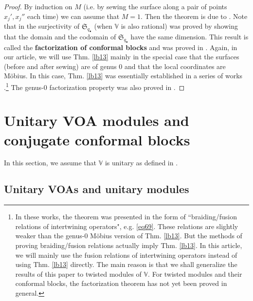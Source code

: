 \documentclass[11pt,b5paper,notitlepage]{article}
\theoremstyle{definition}
\theoremstyle{plain}
\newcommand{\fk}{\mathfrak}
\newcommand{\blt}{\bullet}
\newcommand{\Vbb}{\mathbb V}
\numberwithin{equation}{section}
\begin{document}
\begin{proof}
By induction on $M$ (i.e. by sewing the surface along a pair of points $x_j',x_j''$ each time) we can assume that $M=1$. Then the theorem is due to \cite[Thm. 2.1]{Gui23a}. Note that in \cite{Gui23a} the surjectivity of $\fk S_{q_\blt}$ (when $\Vbb$ is also rational) was proved by showing that the domain and the codomain of $\fk S_{q_\blt}$ have the same dimension. This result is called the \textbf{factorization of conformal blocks} and was proved in \cite{DGT23}. Again, in our article, we will use Thm. \ref{lb13} mainly in the special case that the surfaces (before and after sewing) are of genus 0 and that the local coordinates are M\"obius. In this case, Thm. \ref{lb13} was essentially established in a series of works \cite{HL95a,HL95b,HL95c,Hua95,Hua05}.\footnote{In these works, the theorem was presented in the form of ``braiding/fusion relations of intertwining operators", e.g. \eqref{eq69}. These relations are slightly weaker than the genus-0 M\"obius version of Thm. \ref{lb13}. But the methods of proving braiding/fusion relations actually imply Thm. \ref{lb13}. In this article, we will mainly use the fusion relations of intertwining operators instead of using Thm. \ref{lb13} directly. The main reason is that we shall generalize the results of this paper to twisted modules of $\Vbb$. For twisted modules and their conformal blocks, the factorization theorem has not yet been proved in general.} The genus-0  factorization property was also proved in \cite{NT05}.
\end{proof}




\section{Unitary VOA modules and conjugate conformal blocks}

In this section, we assume that $\Vbb$ is unitary as defined in \cite{DL14,CKLW18}.

\subsection{Unitary VOAs and unitary modules}
\end{document}
